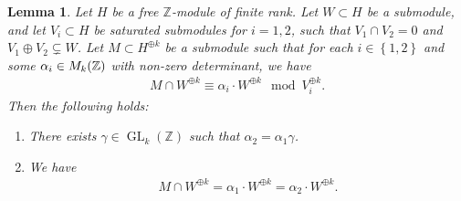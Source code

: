 \documentclass[a4paper,11pt,reqno]{amsart}
\numberwithin{equation}{section}
\theoremstyle{plain}
\newtheorem{lemma}[theorem]{Lemma}
\theoremstyle{definition}
\newcommand{\Z}{\mathbb Z}
\let\rm\relax
\newcommand{\rm}[1]{{\mathrm{#1}}}
\newcommand{\GL}{\operatorname{GL}}
\newcommand{\set}[1]{\left\{ #1 \right\}}
\begin{document}
\begin{lemma} \label{lemma:preliminary-three}
    Let $H$ be a free $\Z$-module of finite rank. Let $W \subset H$ be a submodule, and let $V_i \subset H$ be saturated submodules for $i = 1,2$, such that $V_1 \cap V_2 = 0$ and $V_1 \oplus V_2 \subsetneq W$. Let $M \subset H^{\oplus k}$ be a submodule such that  for each $i \in \set{1,2}$ and some $\alpha_i \in \rm{M}_k(\Z)$ with non-zero determinant, we have
    \begin{align} \label{align:fundamental-assumption}
    M \cap W^{\oplus k} \equiv \alpha_i \cdot W^{\oplus k} \mod V_i^{\oplus k} .
    \end{align} 
    Then the following holds: \begin{enumerate}
        \item \label{item:firstitem:WH}There exists $\gamma \in \GL_k(\Z)$ such that $\alpha_2 = \alpha_1 \gamma$.
        \item \label{item:seconditem:WH}We have 
        \begin{align}
            \label{align:equality-submodules-k}
            M \cap W^{\oplus k} = \alpha_1 \cdot W^{\oplus k} = \alpha_2 \cdot W^{\oplus k}. 
        \end{align}
    \end{enumerate}
\end{lemma}
\end{document}

